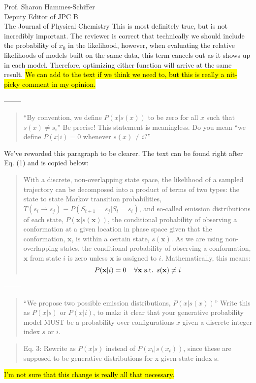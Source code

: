 \documentclass{letter}
\newcommand{\separate}{\begin{center}--------\end{center}}
\begin{document}
\begin{letter}{Prof. Sharon Hammes-Schiffer \\ Deputy Editor of JPC B \\ The Journal of Physical Chemistry}
This is most definitely true, but is not incredibly important. The reviewer is correct that technically we should include the probability of $x_0$ in the likelihood, however, when evaluating the relative likelihoods of models built on the same data, this term cancels out as it shows up in each model. Therefore, optimizing either function will arrive at the same result. \hl{We can add to the text if we think we need to, but this is really a nit-picky comment in my opinion.}

\separate
\begin{quote}
``By convention, we define $P(x | s(x))$ to be zero for all $x$ such that $s(x) \ne s_i$'' Be precise!  This statement is meaningless.  Do you mean ``we define $P(x | i) = 0$ whenever $s(x)\ne i$?''
\end{quote}

We've reworded this paragraph to be clearer. The text can be found right after Eq. (1) and is copied below:
\begin{quote}
With a discrete, non-overlapping state space, the likelihood of a sampled trajectory can be decomposed into a product of terms of two types: the state to state Markov transition probabilities, $T(s_i \rightarrow s_j) \equiv P(S_{t+1}=s_j | S_{t}=s_i)$, and so-called emission distributions of each state, $P(\mathbf{x} | s(\mathbf{x}))$, the conditional probability of observing a conformation at a given location in phase space given that the conformation, $\mathbf{x}$, is within a certain state, $s(\mathbf{x})$. As we are using  non-overlapping states, the conditional probability of observing a conformation, $\mathbf{x}$ from state $i$ is zero unless $\mathbf{x}$ is assigned to $i$. Mathematically, this means:
$$ P(\mathbf{x} | i) = 0 \;\;\;\; \forall \mathbf{x} \textnormal{ s.t. } s(\mathbf{x}) \neq i$$
\end{quote}

\separate
\begin{quote}
``We propose two possible emission distributions, $P(x | s(x))$''  Write this as $P(x | s)$ or $P(x | i)$, to make it clear that your generative probability model MUST be a probability over configurations $x$ given a discrete integer index $s$ or $i$.
\end{quote}

\begin{quote}
Eq. 3: Rewrite as $P(x|s)$ instead of $P(x_t|s(x_t))$, since these are supposed to be generative distributions for x given state index s.
\end{quote}
\hl{I'm not sure that this change is really all that necessary.}


\end{letter}
\end{document}

